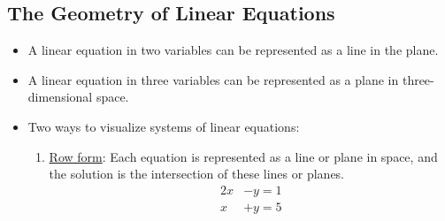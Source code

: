 \documentclass[12pt]{article}
\begin{document}
\subsection{The Geometry of Linear Equations}
\begin{itemize}
    \item A linear equation in two variables can be represented as a line in the plane.
    \item A linear equation in three variables can be represented as a plane in three-dimensional space.
    \item Two ways to visualize systems of linear equations:
    \begin{enumerate}
        \item \underline{Row form}: Each equation is represented as a line or plane in space, and the solution is the intersection of these lines or planes.
        \begin{align}
            2x &- y = 1\\
            x &+ y = 5
        \end{align}


\end{enumerate}
\end{itemize}
\end{document}
